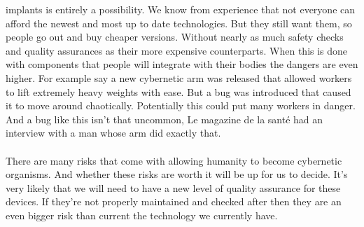 \documentclass[12pt,a4paper,notitlepage]{article}
\begin{document}
implants is entirely a possibility. We know from experience that not everyone
can afford the newest and most up to date technologies. But they still want
them, so people go out and buy cheaper versions. Without nearly as much safety
checks and quality assurances as their more expensive counterparts. When this is
done with components that people will integrate with their bodies the dangers
are even higher. For example say a new cybernetic arm was released that allowed
workers to lift extremely heavy weights with ease. But a bug was introduced that
caused it to move around chaotically. Potentially this could put many workers in
danger. And a bug like this isn't that uncommon, Le magazine de la sant\'{e} had
an interview with a man whose arm did exactly that. 
\\\\
There are many risks that come with allowing humanity to become cybernetic
organisms. And whether these risks are worth it will be up for us to decide.
It's very likely that we will need to have a new level of quality assurance for
these devices. If they're not properly maintained and checked after then they
are an even bigger risk than current the technology we currently have.
\end{document}
